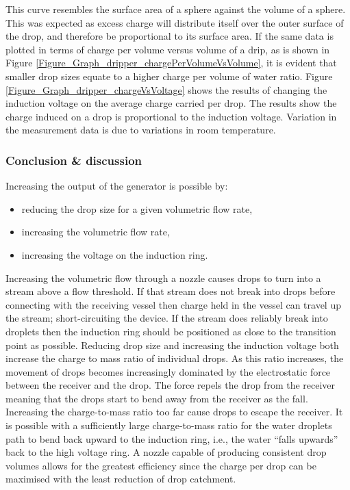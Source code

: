     This curve resembles the surface area of a sphere against the volume of a sphere.
    This was expected as excess charge will distribute itself over the outer surface of the drop, and therefore be proportional to its surface area.
    If the same data is plotted in terms of charge per volume versus volume of a drip, as is shown in Figure \ref{Figure_Graph_dripper_chargePerVolumeVsVolume}, it is evident that smaller drop sizes equate to a higher charge per volume of water ratio.    
    Figure \ref{Figure_Graph_dripper_chargeVsVoltage} shows the results of changing the induction voltage on the average charge carried per drop.
    The results show the charge induced on a drop is proportional to the induction voltage.
    Variation in the measurement data is due to variations in room temperature.


  \subsubsection*{Conclusion \& discussion}
  
    Increasing the output of the generator is possible by:
    \begin{itemize}
    \item reducing the drop size for a given volumetric flow rate,
    \item increasing the volumetric flow rate,
    \item increasing the voltage on the induction ring.
    \end{itemize}
    Increasing the volumetric flow through a nozzle causes drops to turn into a stream above a flow threshold.
    If that stream does not break into drops before connecting with the receiving vessel then charge held in the vessel can travel up the stream; short-circuiting the device.
    If the stream does reliably break into droplets then the induction ring should be positioned as close to the transition point as possible. 
    Reducing drop size and increasing the induction voltage both increase the charge to mass ratio of individual drops.
    As this ratio increases, the movement of drops becomes increasingly dominated by the electrostatic force between the receiver and the drop.
    The force repels the drop from the receiver meaning that the drops start to bend away from the receiver as the fall.
    Increasing the charge-to-mass ratio too far cause drops to escape the receiver.
    It is possible with a sufficiently large charge-to-mass ratio for the water droplets path to bend back upward to the induction ring, i.e., the water ``falls upwards'' back to the high voltage ring.
    A nozzle capable of producing consistent drop volumes allows for the greatest efficiency since the charge per drop can be maximised with the least reduction of drop catchment. 
  
